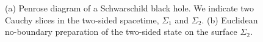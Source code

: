 \documentclass[12pt]{article}
\numberwithin{equation}{section}
\begin{document}
 
\begin{figure}[h!]
\begin{center}
  \hspace{1cm} 
 \caption{\label{fig:appendix1} (a) Penrose diagram of a Schwarschild black hole. We indicate two Cauchy slices in the two-sided spacetime, $\Sigma_1$ and $\Sigma_2$. (b) Euclidean no-boundary preparation of the two-sided state on the surface $\Sigma_2$. }
\end{center}
\end{figure}
\end{document}
